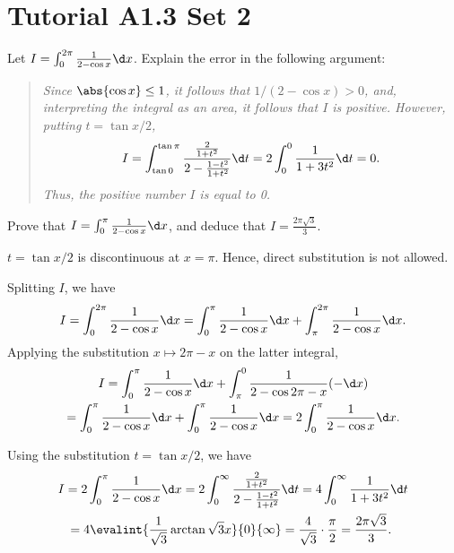 \section{Tutorial A1.3 Set 2}

\begin{problem}
    Let $I = \int_0^{2\pi} \frac{1}{2 - \cos x} \d x$. Explain the error in the following argument:

    \begin{quote}\itshape
        Since $\abs{\cos x} \leq 1$, it follows that $1/(2-\cos x) > 0$, and, interpreting the integral as an area, it follows that $I$ is positive. However, putting $t = \tan{x/2}$, \[I = \int_{\tan 0}^{\tan \pi} \frac{\frac{2}{1+t^2}}{2 - \frac{1-t^2}{1 + t^2}} \d t = 2\int_0^0 \frac{1}{1 + 3t^2} \d t = 0.\] Thus, the positive number $I$ is equal to 0.
    \end{quote}

    Prove that $I = \int_0^\pi \frac1{2 - \cos x} \d x$, and deduce that $I = \frac{2\pi\sqrt3}{3}$.
\end{problem}
\begin{solution}
    $t = \tan{x/2}$ is discontinuous at $x = \pi$. Hence, direct substitution is not allowed.

    Splitting $I$, we have \[I = \int_0^{2\pi} \frac1{2 - \cos x} \d x = \int_0^{\pi} \frac1{2 - \cos x} \d x + \int_{\pi}^{2\pi} \frac1{2 - \cos x} \d x.\] Applying the substitution $x \mapsto 2\pi - x$ on the latter integral,
    \begin{gather*}
        I = \int_0^{\pi} \frac1{2 - \cos x} \d x + \int_{\pi}^0 \frac1{2 - \cos{2\pi - x}} (-\d x)\\
        = \int_0^{\pi} \frac1{2 - \cos x} \d x + \int_0^{\pi} \frac1{2 - \cos x} \d x = 2 \int_0^{\pi} \frac1{2 - \cos x} \d x.
    \end{gather*}

    Using the substitution $t = \tan{x/2}$, we have
    \begin{gather*}
        I = 2\int_0^{\pi} \frac1{2 - \cos x} \d x = 2\int_0^{\infty} \frac{\frac{2}{1+t^2}}{2 - \frac{1-t^2}{1 + t^2}} \d t = 4\int_0^\infty \frac1{1 + 3t^2} \d t\\
        = 4 \evalint{\frac1{\sqrt3} \arctan{\sqrt3 x}}{0}{\infty} = \frac{4}{\sqrt3} \cdot \frac\pi2 = \frac{2\pi \sqrt3}3.\
    \end{gather*}
\end{solution}

